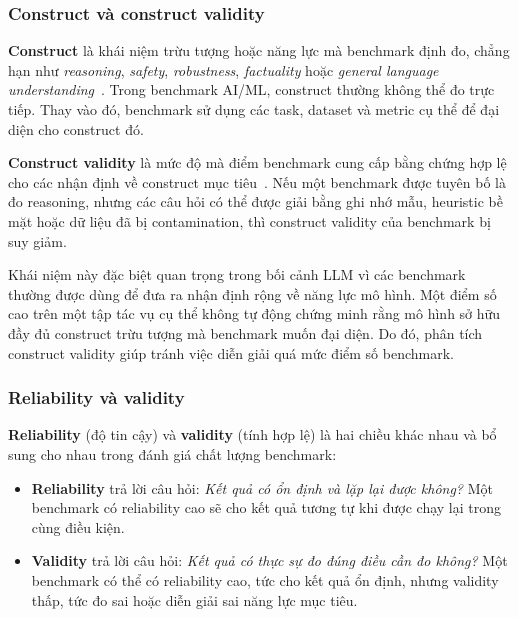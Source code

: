 \subsubsection{Construct và construct validity}
\label{sec:construct_validity}

\textbf{Construct} là khái niệm trừu tượng hoặc năng lực mà benchmark định đo, chẳng hạn như \textit{reasoning}, \textit{safety}, \textit{robustness}, \textit{factuality} hoặc \textit{general language understanding}~\cite{measuring_what_matters}. Trong benchmark AI/ML, construct thường không thể đo trực tiếp. Thay vào đó, benchmark sử dụng các task, dataset và metric cụ thể để đại diện cho construct đó.

\textbf{Construct validity} là mức độ mà điểm benchmark cung cấp bằng chứng hợp lệ cho các nhận định về construct mục tiêu~\cite{measuring_what_matters, everything_benchmark}. Nếu một benchmark được tuyên bố là đo reasoning, nhưng các câu hỏi có thể được giải bằng ghi nhớ mẫu, heuristic bề mặt hoặc dữ liệu đã bị contamination, thì construct validity của benchmark bị suy giảm.

Khái niệm này đặc biệt quan trọng trong bối cảnh LLM vì các benchmark thường được dùng để đưa ra nhận định rộng về năng lực mô hình. Một điểm số cao trên một tập tác vụ cụ thể không tự động chứng minh rằng mô hình sở hữu đầy đủ construct trừu tượng mà benchmark muốn đại diện. Do đó, phân tích construct validity giúp tránh việc diễn giải quá mức điểm số benchmark.

\subsubsection{Reliability và validity}
\label{sec:reliability_validity}

\textbf{Reliability} (độ tin cậy) và \textbf{validity} (tính hợp lệ) là hai chiều khác nhau và bổ sung cho nhau trong đánh giá chất lượng benchmark:

\begin{itemize}
    \item \textbf{Reliability} trả lời câu hỏi: \textit{Kết quả có ổn định và lặp lại được không?} Một benchmark có reliability cao sẽ cho kết quả tương tự khi được chạy lại trong cùng điều kiện.
    \item \textbf{Validity} trả lời câu hỏi: \textit{Kết quả có thực sự đo đúng điều cần đo không?} Một benchmark có thể có reliability cao, tức cho kết quả ổn định, nhưng validity thấp, tức đo sai hoặc diễn giải sai năng lực mục tiêu.
\end{itemize}

